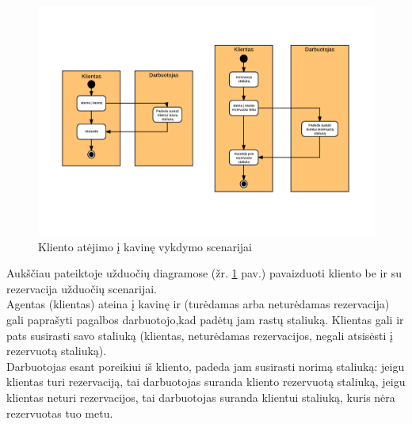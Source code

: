 \documentclass{VUMIFPSkursinis}
\begin{document}
	\begin {figure}[H]
	\centering
		
		\includegraphics[scale=1]{img/3lab/Diagrama3}
		\caption{Kliento atėjimo į kavinę vykdymo scenarijai}
		\label{fig:diagrama3}
	\end{figure}

Aukščiau pateiktoje užduočių diagramose (žr. \ref{fig:diagrama3} pav.) pavaizduoti kliento be ir su rezervacija užduočių scenarijai.\\ 
Agentas (klientas) ateina į kavinę ir (turėdamas arba neturėdamas rezervacija) gali paprašyti pagalbos darbuotojo,kad padėtų jam rastų staliuką. Klientas gali ir pats susirasti savo staliuką (klientas, neturėdamas rezervacijos, negali atsisėsti į rezervuotą staliuką). \\
Darbuotojas esant poreikiui iš kliento, padeda jam susirasti norimą staliuką: jeigu klientas turi rezervaciją, tai darbuotojas suranda kliento rezervuotą staliuką, jeigu klientas neturi rezervacijos, tai darbuotojas suranda klientui staliuką, kuris nėra rezervuotas tuo metu.\\

\end{document}
